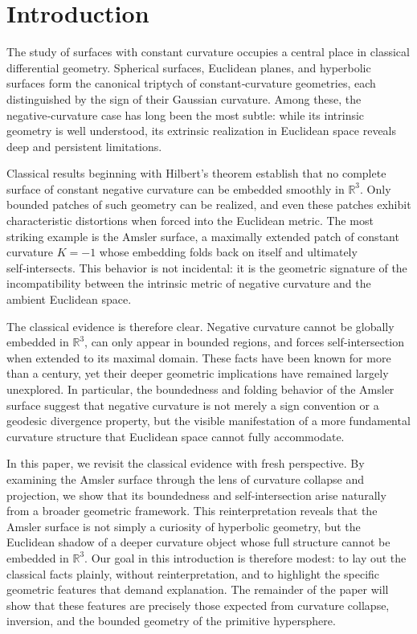 \documentclass[final,onefignum,onetabnum]{siamart}
\begin{document}

\section{Introduction}

The study of surfaces with constant curvature occupies a central place in classical differential geometry. Spherical surfaces, Euclidean planes, and hyperbolic surfaces form the canonical triptych of constant‑curvature geometries, each distinguished by the sign of their Gaussian curvature. Among these, the negative‑curvature case has long been the most subtle: while its intrinsic geometry is well understood, its extrinsic realization in Euclidean space reveals deep and persistent limitations.

Classical results beginning with Hilbert’s theorem establish that no complete surface of constant negative curvature can be embedded smoothly in $\mathbb{R}^3$. Only bounded patches of such geometry can be realized, and even these patches exhibit characteristic distortions when forced into the Euclidean metric. The most striking example is the Amsler surface, a maximally extended patch of constant curvature $K = -1$ whose embedding folds back on itself and ultimately self‑intersects. This behavior is not incidental: it is the geometric signature of the incompatibility between the intrinsic metric of negative curvature and the ambient Euclidean space.

The classical evidence is therefore clear. Negative curvature cannot be globally embedded in $\mathbb{R}^3$, can only appear in bounded regions, and forces self‑intersection when extended to its maximal domain. These facts have been known for more than a century, yet their deeper geometric implications have remained largely unexplored. In particular, the boundedness and folding behavior of the Amsler surface suggest that negative curvature is not merely a sign convention or a geodesic divergence property, but the visible manifestation of a more fundamental curvature structure that Euclidean space cannot fully accommodate.

In this paper, we revisit the classical evidence with fresh perspective. By examining the Amsler surface through the lens of curvature collapse and projection, we show that its boundedness and self‑intersection arise naturally from a broader geometric framework. This reinterpretation reveals that the Amsler surface is not simply a curiosity of hyperbolic geometry, but the Euclidean shadow of a deeper curvature object whose full structure cannot be embedded in $\mathbb{R}^3$. Our goal in this introduction is therefore modest: to lay out the classical facts plainly, without reinterpretation, and to highlight the specific geometric features that demand explanation. The remainder of the paper will show that these features are precisely those expected from curvature collapse, inversion, and the bounded geometry of the primitive hypersphere.
\end{document}
